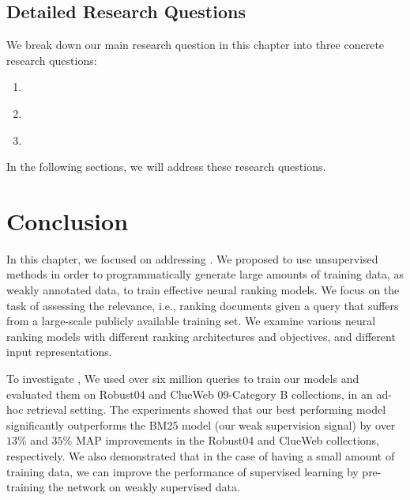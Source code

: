 \subsection{Detailed Research Questions}
We break down our main research question in this chapter into three concrete research questions:
\begin{resqbox}
\begin{enumerate}
\item[\textbf{\resqname{c4.1}}] \emph{}
\item[\textbf{\resqname{c4.2}}] \emph{}
\item[\textbf{\resqname{c4.3}}] \emph{}
\end{enumerate}
\end{resqbox}
In the following sections, we will address these research questions.





\section{Conclusion}
In this chapter, we focused on addressing \textbf{}. 
We proposed to use unsupervised methods in order to programmatically generate large amounts of training data, as weakly annotated data, to train effective neural ranking models. We focus on the task of assessing the relevance, i.e., ranking documents given a query that suffers from a large-scale publicly available training set. We examine various neural ranking models with different ranking architectures and objectives, and different input representations. 

To investigate \textbf{}, We used over six million queries to train our models and evaluated them on Robust04 and ClueWeb 09-Category B collections, in an ad-hoc retrieval setting.  The experiments showed that our best performing model significantly outperforms the BM25 model (our weak supervision signal) by over $13\%$ and $35\%$ MAP improvements in the Robust04 and ClueWeb collections, respectively. 
We also demonstrated that in the case of having a small amount of training data, we can improve the performance of supervised learning by pre-training the network on weakly supervised data.

